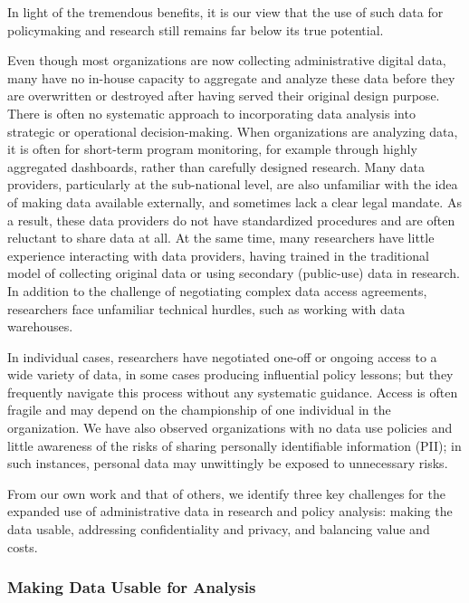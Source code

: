 \documentclass[
]{WileySix}
\begin{document}
In light of the tremendous benefits, it is our view that the use of such data for policymaking and research still remains far below its true potential.

Even though most organizations are now collecting administrative digital data, many have no in-house capacity to aggregate and analyze these data before they are overwritten or destroyed after having served their original design purpose. There is often no systematic approach to incorporating data analysis into strategic or operational decision-making. When organizations are analyzing data, it is often for short-term program monitoring, for example through highly aggregated dashboards, rather than carefully designed research. Many data providers, particularly at the sub-national level, are also unfamiliar with the idea of making data available externally, and sometimes lack a clear legal mandate. As a result, these data providers do not have standardized procedures and are often reluctant to share data at all. At the same time, many researchers have little experience interacting with data providers, having trained in the traditional model of collecting original data or using secondary (public-use) data in research. In addition to the challenge of negotiating complex data access agreements, researchers face unfamiliar technical hurdles, such as working with data warehouses.

In individual cases, researchers have negotiated one-off or ongoing access to a wide variety of data, in some cases producing influential policy lessons; but they frequently navigate this process without any systematic guidance. Access is often fragile and may depend on the championship of one individual in the organization. We have also observed organizations with no data use policies and little awareness of the risks of sharing personally identifiable information (PII); in such instances, personal data may unwittingly be exposed to unnecessary risks.

From our own work and that of others, we identify three key challenges for the expanded use of administrative data in research and policy analysis: making the data usable, addressing confidentiality and privacy, and balancing value and costs.

\hypertarget{making-data-usable-for-analysis}{%
\subsubsection{Making Data Usable for Analysis}\label{making-data-usable-for-analysis}}
\end{document}
